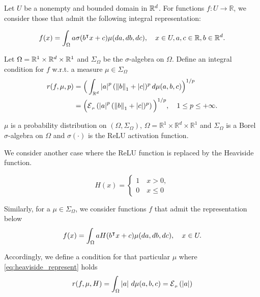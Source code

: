 Let $U$ be a nonempty and bounded domain in $\mathbb{R}^d$. For functions $f: U \to
\mathbb{R}$, we consider those that admit the following integral representation:

\begin{equation}
    \label{eq:barron_represent}
    f(x) = \int_{\Omega} a \sigma(b{}^{\intercal} x + c) \mu(da, db, dc), \quad 
    x \in U, a,c \in \mathbb{R}, b \in \mathbb{R}^d.
\end{equation}

Let $\Omega = \mathbb{R}^1 \times \mathbb{R}^d \times \mathbb{R}^1$ and $\Sigma_{\Omega}$ be the
$\sigma$-algebra on $\Omega$. Define an integral condition for $f$ w.r.t. a
measure $\mu \in \Sigma_{\Omega}$
\begin{align}
    r(f, \mu, p)
    &= \Big(\int_{\R^d} \abs{a}^p  (\norm{b}_1 + \abs{c})^p \,d\mu(a,b,c)\Big)^{1/p} \\
    &= \Big(\ERWi{\mu}{\abs{a}^p  (\norm{b}_1 + \abs{c})^p}\Big)^{1/p},
    \quad 1 \leq p \leq +\infty.
\end{align}

$\mu$ is a probability distribution on $(\Omega, \Sigma_\Omega)$, $\Omega =
\mathbb{R}^1 \times \mathbb{R}^d \times \mathbb{R}^1$ and $\Sigma_\Omega$ is a
Borel $\sigma$-algebra on $\Omega$ and $\sigma(\cdot)$ is the ReLU activation
function.

We consider another case where the ReLU function is replaced by the Heaviside
function.

\begin{definition}
    \label{eq:heaviside_represent}
    \begin{equation}
        H(x) = 
        \begin{cases}
            1 \quad x > 0,\\
            0 \quad x \leq 0    
        \end{cases}
    \end{equation}
\end{definition}


Similarly, for a $\mu \in \Sigma_{\Omega}$, we consider functions $f$ that admit
the representation below
\begin{equation}
    \label{eq:heaviside_represent}
    f(x) = \int_{\Omega} a H(b{}^{\intercal} x + c) \mu(da, db, dc), \quad x \in U.
\end{equation}

Accordingly, we define a condition for that particular $\mu$ where
\eqref{eq:heaviside_represent} holds
\begin{align}
    r(f,\mu, H)
    = \int_{\Omega} \abs{a}\,d\mu(a,b,c) = \ERWi{\mu}{\abs{a}}
\end{align}


